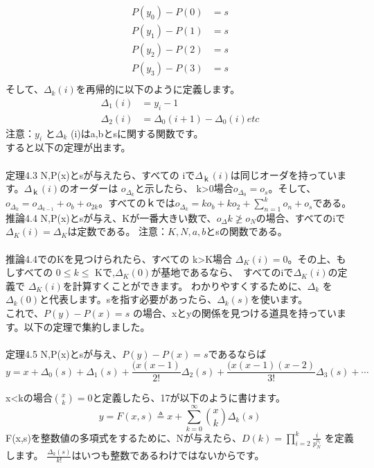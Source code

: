 \documentclass[20 pts]{article}
\begin{document}
\begin{align*}
P(y_0)-P(0)&=s\\
P(y_1)-P(1)&=s\\
P(y_2)-P(2)&=s\\
P(y_3)-P(3)&=s\\
\tag{16}
\end{align*}
そして、$\Delta_{k }(i)$を再帰的に以下のように定義します。
\begin{align*}
\Delta_1(i)&=y_i-1\\
\Delta_2 (i)&= \Delta_0 (i+1)- \Delta_0 (i)etc
\end{align*}
注意：$y_i$ と$\Delta_k$ (i)はa,bとsに関する関数です。\\すると以下の定理が出ます。
\newpage
\paragraph{}
定理4.3
N,P(x)とsが与えたら、すべての iで$\Delta_ｋ (i)$は同じオーダを持っています。$\Delta_ｋ (i)$のオーダーは $o_{\Delta_k}$と示したら、 k>0場合$o_{\Delta_0}= o_s$。そして、$o_{\Delta_k}=o_{\Delta_{k-1}}+o_b+o_{2k}$。すべてのｋでは$o_{\Delta_k}=ko_b+ko_2+\sum_{n=1}^k o_n  +o_s$である。
推論4.4
N,P(x)とsが与え、Kが一番大きい数で、$o_Δk\ngeq o_N$の場合、すべてのiで $\Delta_K (i)= \Delta_K$は定数である。
注意：$K,N,a,b$とsの関数である。
\paragraph{}
推論4.4でのKを見つけられたら、すべての k>K場合 $\Delta_K (i)=0$。その上、もしすべての $0\leq k\leq$ Kで,$\Delta_K (0) $が基地であるなら、　すべてのiで$\Delta_K (i)$の定義で $\Delta_K (i)$を計算すくことができます。
わかりやすくするために、$\Delta_k$ を$\Delta_k (0)$と代表します。sを指す必要があったら、$\Delta_k(s)$を使います。\\これで、$P(y)-P(x)=s$ の場合、xとyの関係を見つける道具を持っています。以下の定理で集約しました。
\paragraph{}
定理4.5
N,P(x)とsが与え、$P(y)-P(x)=s$であるならば
\begin{equation}\tag{17}
y=x+\Delta_0 (s) +\Delta_1 (s)+\frac{(x(x-1)}{2!} \Delta_2 (s)+\frac{(x(x-1)(x-2)}{3!} \Delta_3(s)+⋯		
\end{equation}	

x<kの場合${x \choose k}=0$と定義したら、17が以下のように書けます。
\begin{equation}\tag{18}
y=F(x,s)\triangleq x+\sum_{k=0}^\infty {x \choose k} \Delta_k (s)	
\end{equation}					
F(x,s)を整数値の多項式をするために、Nが与えたら、$D(k)=\prod_{i=2}^k \frac{i}{p_N^{o_i}}$ を定義します。
$\frac{\Delta_k(s)}{k!}$はいつも整数であるわけではないからです。
\end{document}
